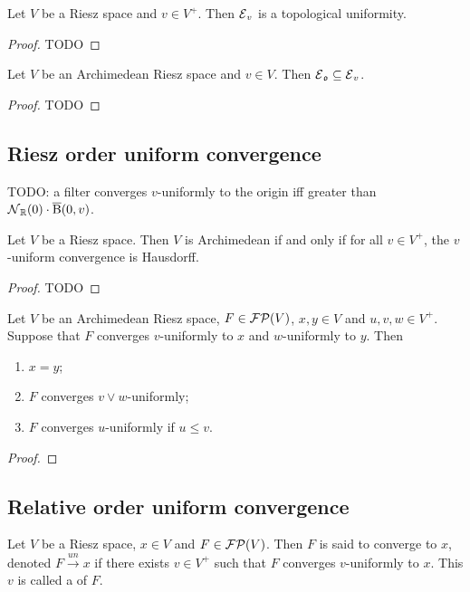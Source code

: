 \begin{lemma}
Let $V$ be a Riesz space and $v\in V^+$. Then $\operatorname{\mathcal{E}}_v$ is a topological uniformity.
\end{lemma}
\begin{proof}
TODO
\end{proof}

\begin{proposition}
Let $V$ be an Archimedean Riesz space and $v\in V$. Then $\operatorname{\mathcal{E}}_\mathfrak{o} \subseteq \operatorname{\mathcal{E}}_v$.
\end{proposition}
\begin{proof}
TODO
\end{proof}

\subsection{Riesz order uniform convergence}
TODO: a filter converges $v$-uniformly to the origin iff greater than $\operatorname{\mathcal{N}}_{\mathbb{R}}(0)\cdot \operatorname{\overline{B}}(0,v)$.

\begin{proposition}
Let $V$ be a Riesz space. Then $V$ is Archimedean \textup{if and only if} for all $v\in V^+$, the $v$-uniform convergence is Hausdorff.
\end{proposition}
\begin{proof}
TODO
\end{proof}

\begin{lemma}
Let $V$ be an Archimedean Riesz space, $F\in\operatorname{\mathcal{FP}}(V)$, $x,y\in V$ and $u,v,w\in V^+$. Suppose that $F$ converges $v$-uniformly to $x$ and $w$-uniformly to $y$. Then
\begin{enumerate}
\item $x = y$;
\item $F$ converges $v \vee w$-uniformly;
\item $F$ converges $u$-uniformly if $u\leq v$.
\end{enumerate}
\end{lemma}
\begin{proof}

\end{proof}

\subsection{Relative order uniform convergence}
\begin{definition}
Let $V$ be a Riesz space, $x\in V$ and $F\in\operatorname{\mathcal{FP}}(V)$. Then $F$ is said to converge  to $x$, denoted $F\overset{un}{\longrightarrow} x$ if there exists $v\in V^+$ such that $F$ converges $v$-uniformly to $x$. This $v$ is called a  of $F$.
\end{definition}



